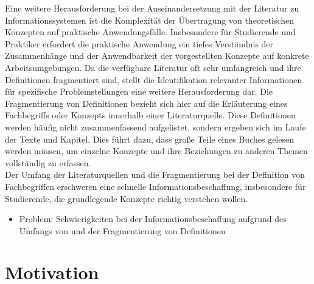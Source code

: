 Eine weitere Herausforderung bei der Auseinandersetzung mit der Literatur zu Informationssystemen ist die Komplexität der Übertragung von theoretischen Konzepten auf praktische Anwendungsfälle.
Insbesondere für Studierende und Praktiker erfordert die praktische Anwendung ein tiefes Verständnis der Zusammenhänge und der Anwendbarkeit der vorgestellten Konzepte auf konkrete Arbeitsumgebungen.
Da die verfügbare Literatur oft sehr umfangreich und ihre Definitionen fragmentiert sind, stellt die Identifikation relevanter Informationen für spezifische Problemstellungen eine weitere Herausforderung dar.
Die Fragmentierung von Definitionen bezieht sich hier auf die Erläuterung eines Fachbegriffs oder Konzepts innerhalb einer Literaturquelle.
Diese Definitionen werden häufig nicht zusammenfassend aufgelistet, sondern ergeben sich im Laufe der Texte und Kapitel.
Dies führt dazu, dass große Teile eines Buches gelesen werden müssen, um einzelne Konzepte und ihre Beziehungen zu anderen Themen vollständig zu erfassen.\\

Der Umfang der Literaturquellen und die Fragmentierung bei der Definition von Fachbegriffen
erschweren eine schnelle Informationsbeschaffung, insbesondere für Studierende, die grundlegende Konzepte richtig verstehen wollen.\\

\begin{itemize}
  \item Problem: Schwierigkeiten bei der Informationsbeschaffung aufgrund des Umfangs von \citet{bb} und der Fragmentierung von Definitionen
\end{itemize}

\section{Motivation}

